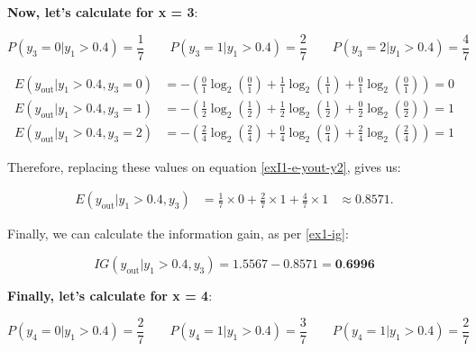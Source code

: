 \documentclass[12pt]{article}
\begin{document}
\begin{enumerate}[leftmargin=\labelsep]
        \textbf{Now, let's calculate for x = 3}:

        \begin{equation*}
          P(y_3 = 0| y_1 > 0.4) = \frac{1}{7} \qquad
          P(y_3 = 1| y_1 > 0.4) = \frac{2}{7} \qquad
          P(y_3 = 2| y_1 > 0.4) = \frac{4}{7}
        \end{equation*}

        \[
          \begin{aligned}
            E(y_{\text{out}} | y_1 > 0.4 , y_3 = 0) & = - \left(\frac{0}{1} \log_2\left(\frac{0}{1}\right) + \frac{1}{1} \log_2\left(\frac{1}{1}\right)
            + \frac{0}{1} \log_2\left(\frac{0}{1}\right)\right) = 0                                                                                     \\
            E(y_{\text{out}} | y_1 > 0.4 , y_3 = 1) & = - \left(\frac{1}{2} \log_2\left(\frac{1}{2}\right) + \frac{1}{2} \log_2\left(\frac{1}{2}\right)
            + \frac{0}{2} \log_2\left(\frac{0}{2}\right)\right) = 1                                                                                     \\
            E(y_{\text{out}} | y_1 > 0.4 , y_3 = 2) & = - \left(\frac{2}{4} \log_2\left(\frac{2}{4}\right) + \frac{0}{4} \log_2\left(\frac{0}{4}\right)
            + \frac{2}{4} \log_2\left(\frac{2}{4}\right)\right) = 1
          \end{aligned}
        \]

        Therefore, replacing these values on equation \eqref{exI1-e-yout-y2}, gives us:

        \[
          \begin{aligned}
            E(y_{\text{out}} | y_1>0.4, y_3) & = \frac{1}{7} \times 0 + \frac{2}{7} \times 1 +  \frac{4}{7} \times 1 & \approx 0.8571.
          \end{aligned}
        \]

        Finally, we can calculate the information gain, as per \eqref{ex1-ig}:

        \[
          IG(y_{\text{out}} | y_1 > 0.4, y_3) = 1.5567 - 0.8571 = \textbf{0.6996}
        \]

        \textbf{Finally, let's calculate for x = 4}:

        \begin{equation*}
          P(y_4 = 0| y_1 > 0.4) = \frac{2}{7} \qquad
          P(y_4 = 1| y_1 > 0.4) = \frac{3}{7} \qquad
          P(y_4 = 1| y_1 > 0.4) = \frac{2}{7}
        \end{equation*}


\end{enumerate}
\end{document}
